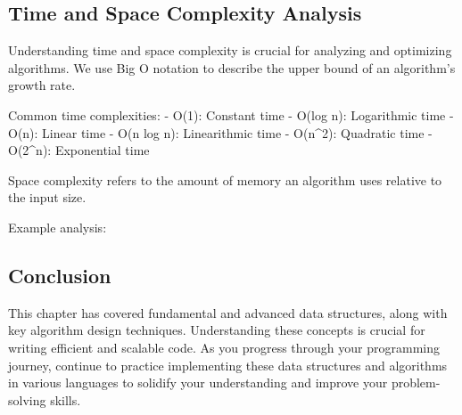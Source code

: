 \hypertarget{time-and-space-complexity-analysis}{%
\subsection{Time and Space Complexity
Analysis}\label{time-and-space-complexity-analysis}}

Understanding time and space complexity is crucial for analyzing and
optimizing algorithms. We use Big O notation to describe the upper bound
of an algorithm's growth rate.

Common time complexities: - O(1): Constant time - O(log n): Logarithmic
time - O(n): Linear time - O(n log n): Linearithmic time - O(n\^{}2):
Quadratic time - O(2\^{}n): Exponential time

Space complexity refers to the amount of memory an algorithm uses
relative to the input size.

Example analysis:

\begin{Shaded}
\begin{Highlighting}[]
     \NormalTok{(}
        \OperatorTok{==}
     \OperatorTok{{-}}

\end{Highlighting}
\end{Shaded}

\hypertarget{conclusion}{%
\subsection{Conclusion}\label{conclusion}}

This chapter has covered fundamental and advanced data structures, along
with key algorithm design techniques. Understanding these concepts is
crucial for writing efficient and scalable code. As you progress through
your programming journey, continue to practice implementing these data
structures and algorithms in various languages to solidify your
understanding and improve your problem-solving skills.


